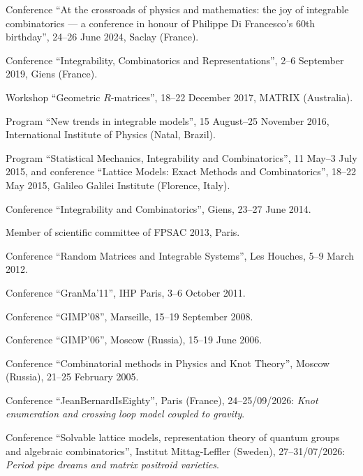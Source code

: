 

\s Conference ``At the crossroads of physics and mathematics: the joy of integrable combinatorics — a conference in honour of Philippe Di Francesco's 60th birthday'', 24--26 June 2024, Saclay (France).

\s Conference ``Integrability, Combinatorics and Representations'', 2--6 September 2019, Giens (France).

\s Workshop ``Geometric $R$-matrices'', 18--22 December 2017, MATRIX (Australia).

\s Program ``New trends in integrable models'', 15 August--25 November 2016, International Institute of Physics (Natal, Brazil).

\s Program ``Statistical Mechanics, Integrability and Combinatorics'', 11 May--3 July 2015, and conference ``Lattice Models: Exact Methods and Combinatorics'', 18--22 May 2015, Galileo Galilei Institute (Florence, Italy).

\s Conference ``Integrability and Combinatorics'', Giens, 23--27 June 2014.

\s Member of scientific committee of FPSAC 2013, Paris.

\s Conference ``Random Matrices and Integrable Systems'', Les Houches, 5--9 March 2012.

\s Conference ``GranMa'11'', IHP Paris, 3--6 October 2011.

\s Conference ``GIMP'08'', Marseille, 15--19 September 2008.

\s Conference ``GIMP'06'', Moscow (Russia), 15--19 June 2006.

\s Conference ``Combinatorial methods in Physics and Knot Theory'', Moscow (Russia), 21--25 February 2005.

\endsec


\s Conference ``JeanBernardIsEighty'', Paris (France), 24--25/09/2026: {\sl Knot enumeration and crossing loop model coupled to gravity}.

\s Conference ``Solvable lattice models, representation theory of
quantum groups and algebraic combinatorics'', Institut Mittag-Leffler (Sweden), 27--31/07/2026: {\sl Period pipe dreams and matrix positroid varieties}.

